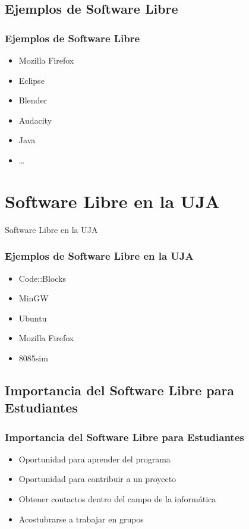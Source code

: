 \documentclass[xetex, mathserif, serif]{beamer}
\begin{document}

\subsection{Ejemplos de Software Libre}
\begin{frame}
    \frametitle{Ejemplos de Software Libre}
    \pause{}
    \begin{itemize}[<+->]
        \item Mozilla Firefox
        \item Eclipse
        \item Blender
        \item Audacity
        \item Java
        \item \ldots
    \end{itemize}
\end{frame}


\section{Software Libre en la UJA}
\begin{frame}
    \centering \Huge Software Libre en la UJA
\end{frame}


\begin{frame}
    \frametitle{Ejemplos de Software Libre en la UJA}
    \pause{}
    \begin{itemize}[<+->]
        \item Code::Blocks
        \item MinGW
        \item Ubuntu
        \item Mozilla Firefox
        \item 8085sim
    \end{itemize}
\end{frame}


\subsection{Importancia del Software Libre para Estudiantes}
\begin{frame}[t]
    \frametitle{Importancia del Software Libre para Estudiantes}
    \pause{}
    \begin{itemize}[<+->]
        \item Oportunidad para aprender del programa
        \item Oportunidad para contribuir a un proyecto
        \item Obtener contactos dentro del campo de la informática
        \item Acostubrarse a trabajar en grupos
    \end{itemize}
\end{frame}
\end{document}
